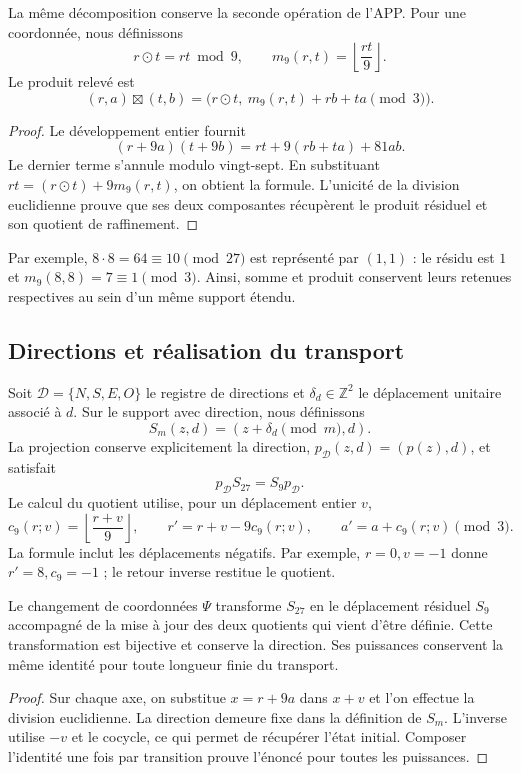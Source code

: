 La même décomposition conserve la seconde opération de l'APP. Pour
une coordonnée, nous définissons
\[
 r\odot t=rt\bmod9,\qquad
 m_9(r,t)=\left\lfloor\frac{rt}{9}\right\rfloor.
\]
Le produit relevé est
\begin{equation}
 (r,a)\boxtimes(t,b)
 =\bigl(r\odot t,\ m_9(r,t)+rb+ta\pmod3\bigr).
 \label{eq:app-refinamiento-producto}
\end{equation}
\begin{proof}
Le développement entier fournit
\[
 (r+9a)(t+9b)=rt+9(rb+ta)+81ab.
\]
Le dernier terme s'annule modulo vingt-sept. En substituant
$rt=(r\odot t)+9m_9(r,t)$, on obtient la formule. L'unicité de la
division euclidienne prouve que ses deux composantes récupèrent le produit
résiduel et son quotient de raffinement.
\end{proof}
Par exemple, $8\cdot8=64\equiv10\pmod{27}$ est représenté par
$(1,1)$ : le résidu est $1$ et
$m_9(8,8)=7\equiv1\pmod3$. Ainsi, somme et produit conservent leurs
retenues respectives au sein d'un même support étendu.

\subsection{Directions et réalisation du transport}

Soit $\mathcal D=\{N,S,E,O\}$ le registre de directions et
$\delta_d\in\mathbb Z^2$ le déplacement unitaire associé à $d$.
Sur le support avec direction, nous définissons
\[
 S_m(z,d)=(z+\delta_d\pmod m,d).
\]
La projection conserve explicitement la direction,
$p_{\mathcal D}(z,d)=(p(z),d)$, et satisfait
\begin{equation}
 p_{\mathcal D}S_{27}=S_9p_{\mathcal D}.
 \label{eq:app-refinamiento-direccion}
\end{equation}
Le calcul du quotient utilise, pour un déplacement entier $v$,
\[
 c_9(r;v)=\left\lfloor\frac{r+v}{9}\right\rfloor,
 \qquad r'=r+v-9c_9(r;v),\qquad
 a'=a+c_9(r;v)\pmod3.
\]
La formule inclut les déplacements négatifs. Par exemple,
$r=0,v=-1$ donne $r'=8,c_9=-1$ ; le retour inverse restitue le quotient.

\begin{proposition}
Le changement de coordonnées $\Psi$ transforme $S_{27}$ en le
déplacement résiduel $S_9$ accompagné de la mise à jour des
deux quotients qui vient d'être définie. Cette transformation est bijective
et conserve la direction. Ses puissances conservent la même identité
pour toute longueur finie du transport.
\end{proposition}
\begin{proof}
Sur chaque axe, on substitue $x=r+9a$ dans $x+v$ et l'on effectue la division
euclidienne. La direction demeure fixe dans la définition de $S_m$.
L'inverse utilise $-v$ et le cocycle, ce qui permet de récupérer l'état
initial. Composer l'identité une fois par transition prouve
l'énoncé pour toutes les puissances.
\end{proof}

